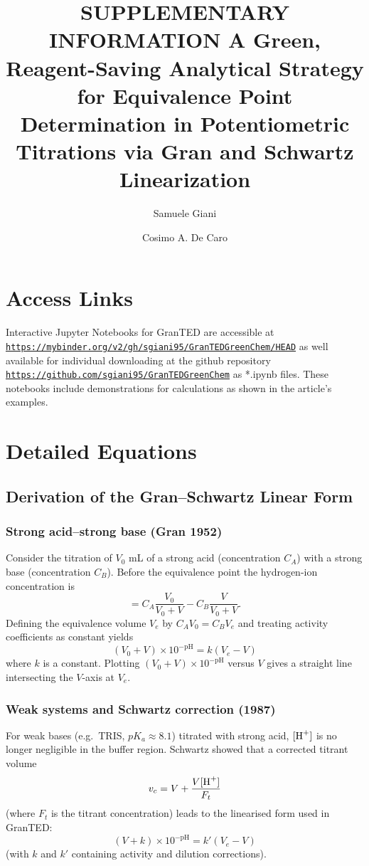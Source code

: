 \documentclass[journal=jacsat,manuscript=article]{achemso}
\author{Samuele Giani}
\affiliation[USZ]
{Universitätsspital Zürich, Rämistrasse 100, 8091 Zürich, Switzerland}
\author{Cosimo A. De Caro}
\affiliation[MT]
{Mettler-Toledo Technologies GmbH, Heuwinkelstrasse 3, 8606 Nänikon, Switzerland}
\title[GranTED]
  {SUPPLEMENTARY INFORMATION \newline \phantom{.} \hline \phantom{.} \newline A Green, Reagent-Saving Analytical Strategy for Equivalence Point Determination in Potentiometric Titrations via Gran and Schwartz Linearization \newline \phantom{.} \hline \phantom{.}}
\begin{document}
%
\section{Access Links}
Interactive Jupyter Notebooks for \textsf{GranTED} are accessible at \newline
\href{https://mybinder.org/v2/gh/sgiani95/GranTEDGreenChem/HEAD}{\texttt{https://mybinder.org/v2/gh/sgiani95/GranTEDGreenChem/HEAD}}
as well available for individual downloading at the github repository \newline\href{https://github.com/sgiani95/GranTEDGreenChem}{\texttt{https://github.com/sgiani95/GranTEDGreenChem}} 
as *.ipynb files. These notebooks include demonstrations for calculations as shown in the article’s examples.

\section{Detailed Equations}

\subsection*{Derivation of the Gran--Schwartz Linear Form}

\subsubsection*{Strong acid--strong base (Gran 1952)}
Consider the titration of $V_0$ mL of a strong acid (concentration $C_A$) with a strong base (concentration $C_B$). Before the equivalence point the hydrogen-ion concentration is
\begin{equation}
[\ce{H+}] = C_A \frac{V_0}{V_0+V} - C_B \frac{V}{V_0+V}.
\end{equation}
Defining the equivalence volume $V_e$ by $C_A V_0 = C_B V_e$ and treating activity coefficients as constant yields
\begin{equation}
(V_0 + V) \times 10^{-\mathrm{pH}} = k (V_e - V) \label{eq:gran1952}
\end{equation}
where $k$ is a constant. Plotting $(V_0 + V) \times 10^{-\mathrm{pH}}$ versus $V$ gives a straight line intersecting the $V$-axis at $V_e$.

\subsubsection*{Weak systems and Schwartz correction (1987)}
For weak bases (e.g.\ TRIS, $pK_a \approx 8.1$) titrated with strong acid, $[\ce{H+}]$ is no longer negligible in the buffer region. Schwartz showed that a corrected titrant volume
\begin{equation}
v_c = V + \frac{V [\ce{H+}]}{F_t}
\end{equation}
(where $F_t$ is the titrant concentration) leads to the linearised form used in GranTED:
\begin{equation}
(V + k) \times 10^{-\mathrm{pH}} = k' (V_e - V) \label{eq:schwartz}
\end{equation}
(with $k$ and $k'$ containing activity and dilution corrections).
\end{document}
